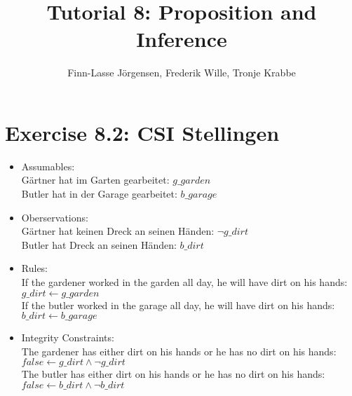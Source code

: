 \documentclass[12pt,a4paper]{article}
\author{Finn-Lasse Jörgensen, Frederik Wille, Tronje Krabbe}
\title{Tutorial 8: Proposition and Inference}
\begin{document}
\maketitle

\section*{Exercise 8.2: CSI Stellingen}
\begin{itemize}
\item Assumables:\\
    Gärtner hat im Garten gearbeitet: $ g\_garden $\\
    Butler hat in der Garage gearbeitet: $ b\_garage $\\
\item Oberservations:\\
    Gärtner hat keinen Dreck an seinen Händen: $ \neg g\_dirt $ \\
    Butler hat Dreck an seinen Händen: $ b\_dirt $ \\
\item Rules:\\
    If the gardener worked in the garden all day, he will have dirt on his hands: $ g\_dirt \leftarrow g\_garden $\\
    If the butler worked in the garage all day, he will have dirt on his hands: $ b\_dirt \leftarrow b\_garage $
\item Integrity Constraints:\\
    The gardener has either dirt on his hands or he has no dirt on his hands: $ false \leftarrow g\_dirt \land \neg g\_dirt $\\
    The butler has either dirt on his hands or he has no dirt on his hands: $ false \leftarrow b\_dirt \land \neg b\_dirt $\\
\end{itemize}
\end{document}
